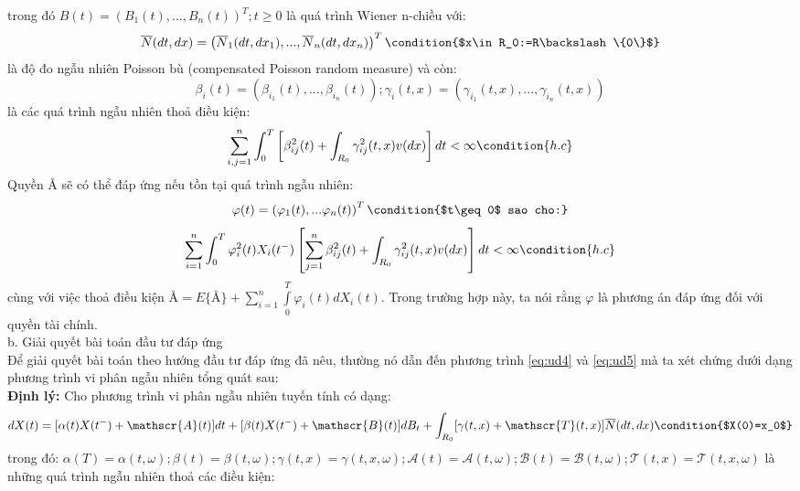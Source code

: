 \documentclass[14pt,a4paper]{article}
\numberwithin{equation}{section}
\begin{document}
trong đó $B(t)=(B_1(t),...,B_n(t))^T;t\geq 0$ là quá trình Wiener n-chiều với:
\begin{equation*}
	\overline{N}(dt,dx)=\left(\overline{N}_1(dt,dx_1),...,\overline{N}_n(dt,dx_n)\right)^T \condition{$x\in R_0:=R\backslash\{0\}$}
\end{equation*}
là độ đo ngẫu nhiên Poisson bù (compensated Poisson random measure) và còn:
\begin{equation*}
	\beta_i(t)=(\beta_{i_1}(t),...,\beta_{i_n}(t));\gamma_i(t,x)=(\gamma_{i_1}(t,x),...,\gamma_{i_n}(t,x))
\end{equation*}
là các quá trình ngẫu nhiên thoả điều kiện:
\begin{equation*}
	\sum_{i,j=1}^{n}\int_{0}^{T}\left[\beta_{ij}^2(t)+\int_{R_0}\gamma_{ij}^2(t,x)v(dx) \right]dt<\infty \condition{h.c}
\end{equation*}
Quyền $\text{\AA}$ sẽ có thể đáp ứng nếu tồn tại quá trình ngẫu nhiên:
\begin{equation*}
	\varphi(t)=\left(\varphi_1(t),...\varphi_n(t) \right)^T \condition{$t\geq 0$ sao cho:}\\
\end{equation*}
\begin{equation*}
	\sum_{i=1}^{n}\int_{0}^{T}\varphi_i^2(t)X_i(t^-)\left[\sum_{j=1}^{n}\beta_{ij}^2(t)+\int_{R_0}\gamma_{ij}^2(t,x)v(dx) \right]dt<\infty \condition{h.c}
\end{equation*}
cùng với việc thoả điều kiện $\text{\AA}=E\{\text{\AA}\}+\sum\limits_{i=1}^{n}\int\limits_{0}^{T}\varphi_i(t)dX_i(t)$. Trong trường hợp này, ta nói rằng $\varphi$ là phương án đáp ứng đối với quyền tài chính.\\
b. Giải quyết bài toán đầu tư đáp ứng\\
Để giải quyết bài toán theo hướng đầu tư đáp ứng đã nêu, thường nó dẫn đến phương trình \eqref{eq:ud4} và \eqref{eq:ud5} mà ta xét chứng dưới dạng phương trình vi phân ngẫu nhiên tổng quát sau:\\
\textbf{Định lý:} Cho phương trình vi phân ngẫu nhiên tuyến tính có dạng:
\begin{dmath*}
dX(t)=[\alpha(t)X(t^-)+\mathscr{A}(t)]dt+[\beta(t)X(t^-)+\mathscr{B}(t)]dB_t\\ +\int_{R_0}[\gamma(t,x)+\mathscr{T}(t,x)]\overline{N}(dt,dx) \condition{$X(0)=x_0$}
\end{dmath*}
trong đó: $\alpha(T)=\alpha(t,\omega);\beta(t)=\beta(t,\omega);\gamma(t,x)=\gamma(t,x,\omega);\mathscr{A}(t)=\mathscr{A}(t,\omega);\mathscr{B}(t)=\mathscr{B}(t,\omega);\mathscr{T}(t,x)=\mathscr{T}(t,x,\omega)$ là những quá trình ngẫu nhiên thoả các điều kiện:
\end{document}
